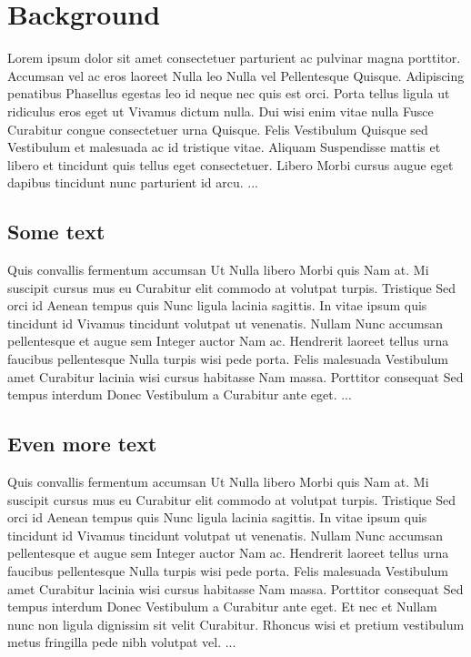 \chapter{Background} \label{chap:background}

Lorem ipsum dolor sit amet consectetuer parturient ac pulvinar magna porttitor. Accumsan vel ac eros laoreet Nulla leo Nulla vel Pellentesque Quisque. Adipiscing penatibus Phasellus egestas leo id neque nec quis est orci. Porta tellus ligula ut ridiculus eros eget ut Vivamus dictum nulla. Dui wisi enim vitae nulla Fusce Curabitur congue consectetuer urna Quisque. Felis Vestibulum Quisque sed Vestibulum et malesuada ac id tristique vitae. Aliquam Suspendisse mattis et libero et tincidunt quis tellus eget consectetuer. Libero Morbi cursus augue eget dapibus tincidunt nunc parturient id arcu.
...

\section{Some text}
Quis convallis fermentum accumsan Ut Nulla libero Morbi quis Nam at. Mi suscipit cursus mus eu Curabitur elit commodo at volutpat turpis. Tristique Sed orci id Aenean tempus quis Nunc ligula lacinia sagittis. In vitae ipsum quis tincidunt id Vivamus tincidunt volutpat ut venenatis. Nullam Nunc accumsan pellentesque et augue sem Integer auctor Nam ac. Hendrerit laoreet tellus urna faucibus pellentesque Nulla turpis wisi pede porta. Felis malesuada Vestibulum amet Curabitur lacinia wisi cursus habitasse Nam massa. Porttitor consequat Sed tempus interdum Donec Vestibulum a Curabitur ante eget.
...

\section{Even more text}
Quis convallis fermentum accumsan Ut Nulla libero Morbi quis Nam at. Mi suscipit cursus mus eu Curabitur elit commodo at volutpat turpis. Tristique Sed orci id Aenean tempus quis Nunc ligula lacinia sagittis. In vitae ipsum quis tincidunt id Vivamus tincidunt volutpat ut venenatis. Nullam Nunc accumsan pellentesque et augue sem Integer auctor Nam ac. Hendrerit laoreet tellus urna faucibus pellentesque Nulla turpis wisi pede porta. Felis malesuada Vestibulum amet Curabitur lacinia wisi cursus habitasse Nam massa. Porttitor consequat Sed tempus interdum Donec Vestibulum a Curabitur ante eget. Et nec et Nullam nunc non ligula dignissim sit velit Curabitur. Rhoncus wisi et pretium vestibulum metus fringilla pede nibh volutpat vel. ...